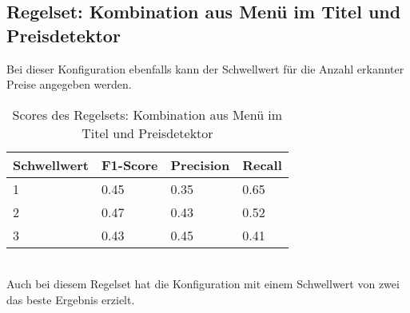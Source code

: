 \subsection{Regelset: Kombination aus Menü im Titel und Preisdetektor}
Bei dieser Konfiguration ebenfalls kann der Schwellwert für die Anzahl erkannter Preise angegeben werden.\\
\begin{table}
	\caption{Scores des Regelsets: Kombination aus Menü im Titel und Preisdetektor}
	\centering
\begin{tabular}{|l|l|l|l|}
	\hline
	Schwellwert & F1-Score & Precision & Recall\\
	\hline
	1 & 0.45 & 0.35 & 0.65 \\
	2 & 0.47 & 0.43 & 0.52 \\
	3 & 0.43 & 0.45 & 0.41 \\
	\hline
\end{tabular}
\end{table}\\
Auch bei diesem Regelset hat die Konfiguration mit einem Schwellwert von zwei das beste Ergebnis erzielt.
